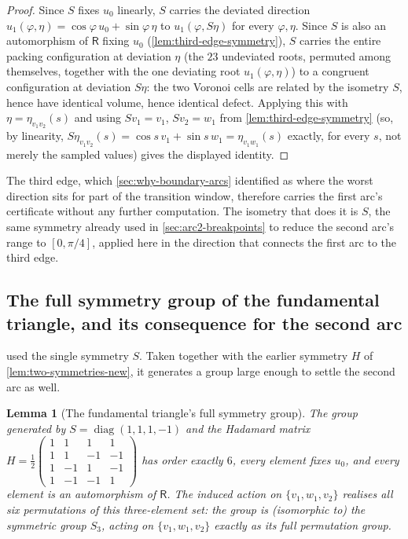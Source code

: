 \documentclass[11pt,reqno]{amsart}
\renewcommand{\_}{\origunderscore\allowbreak}
\numberwithin{equation}{section}
\theoremstyle{plain}
\newtheorem{lem}[thm]{Lemma}
\theoremstyle{definition}
\theoremstyle{remark}
\newcommand{\Rt}{\mathsf{R}}                 %
\newcommand{\tilt}{\varphi}                  %
\newcommand{\arcp}{s}                        %
\newcommand{\dev}{\eta}                      %
\DeclareMathOperator{\diag}{diag}
\begin{document}
\begin{proof}
Since $S$ fixes $u_0$ linearly, $S$ carries the deviated direction
$u_1(\tilt,\dev)=\cos\tilt\,u_0+\sin\tilt\,\dev$ to
$u_1(\tilt,S\dev)$ for every $\tilt,\dev$. Since $S$ is also an
automorphism of $\Rt$ fixing $u_0$ (\cref{lem:third-edge-symmetry}),
$S$ carries the entire packing configuration at deviation $\dev$ (the
$23$ undeviated roots, permuted among themselves, together with the
one deviating root $u_1(\tilt,\dev)$) to a congruent configuration at
deviation $S\dev$: the two Voronoi cells are related by the isometry
$S$, hence have identical volume, hence identical defect. Applying
this with $\dev=\dev_{v_1v_2}(\arcp)$ and using $Sv_1=v_1$, $Sv_2=w_1$
from \cref{lem:third-edge-symmetry} (so, by linearity,
$S\dev_{v_1v_2}(\arcp)=\cos\arcp\,v_1+\sin\arcp\,w_1=\dev_{v_1w_1}(\arcp)$
exactly, for every $\arcp$, not merely the sampled values) gives the
displayed identity.
\end{proof}

The third edge, which \cref{sec:why-boundary-arcs} identified as where
the worst direction sits for part of the transition window, therefore
carries the first arc's certificate without any further computation. The
isometry that does it is $S$, the same symmetry already used in
\cref{sec:arc2-breakpoints} to reduce the second arc's range to
$[0,\pi/4]$, applied here in the direction that connects the first arc to
the third edge.

\subsection{The full symmetry group of the fundamental triangle, and its consequence for the second arc}\label{sec:full-triangle-symmetry}

 used the single symmetry $S$. Taken
together with the earlier symmetry $H$ of
\cref{lem:two-symmetries-new}, it generates a group large enough to
settle the second arc as well.

\begin{lem}[The fundamental triangle's full symmetry group]\label{lem:s3-symmetry}
The group generated by $S=\diag(1,1,1,-1)$ and the Hadamard matrix
$H=\tfrac12\left(\begin{smallmatrix}1&1&1&1\\1&1&-1&-1\\1&-1&1&-1\\1&-1&-1&1\end{smallmatrix}\right)$
has order exactly $6$, every element fixes $u_0$, and every element is
an automorphism of $\Rt$. The induced action on $\{v_1,w_1,v_2\}$
realises \emph{all six} permutations of this three-element set: the
group is (isomorphic to) the symmetric group $S_3$, acting on
$\{v_1,w_1,v_2\}$ exactly as its full permutation group.
\end{lem}
\end{document}
